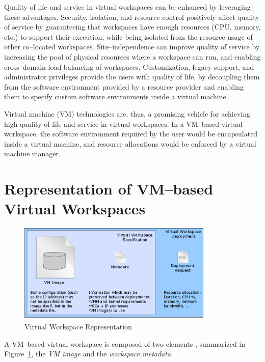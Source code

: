 Quality of life and service in virtual workspaces can be enhanced by leveraging these advantages. Security, isolation, and resource control positively affect quality of service by guaranteeing that workspaces have enough resources (CPU, memory, etc.) to support their execution, while being isolated from the resource usage of other co--located workspaces. Site--independence can improve quality of service by increasing the pool of physical resources where a workspace can run, and enabling cross--domain load balancing of workspaces. Customization, legacy support, and administrator privileges provide the users with quality of life, by decoupling them from the software environment provided by a resource provider and enabling them to specify custom software environments inside a virtual machine.

Virtual machine (VM) technologies  are, thus, a promising vehicle for achieving high quality of life and service in virtual workspaces. In a VM--based virtual workspace, the software environment required by the user would be encapsulated inside a virtual machine, and resource allocations would be enforced by a virtual machine manager.

\section{Representation of VM--based Virtual Workspaces}
\label{sec:vwrepresentation}

\begin{figure}
  \begin{center}
    \includegraphics[width=0.85\textwidth]{figures/vw_representation.png}
    \caption{Virtual Workspace Representation}
	\label{fig:vwrepresentation}
  \end{center}
\end{figure}


A VM--based virtual workspace is composed of two elements \cite{VirtualWorkspaces05}, summarized in Figure~\ref{fig:vwrepresentation}, the \emph{VM image} and the \emph{workspace metadata}.

